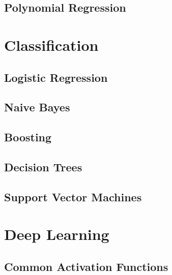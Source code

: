 \documentclass[18pt,a3paper,landscape, ncols=3]{cheatsheet}
\begin{document}
	\subsection{Polynomial Regression}
		\begin{mdframed}
		\end{mdframed}

\section{Classification} \seperator
	\subsection{Logistic Regression}
		\begin{mdframed}
		\end{mdframed}
	\subsection{Naive Bayes}
		\begin{mdframed}
		\end{mdframed}
	\subsection{Boosting}
		\begin{mdframed}
		\end{mdframed}
	\subsection{Decision Trees}
		\begin{mdframed}
		\end{mdframed}
	\subsection{Support Vector Machines}
		\begin{mdframed}
		\end{mdframed}

\section{Deep Learning} \seperator
	\subsection{Common Activation Functions}
		\begin{mdframed}
		\end{mdframed}
\end{document}
